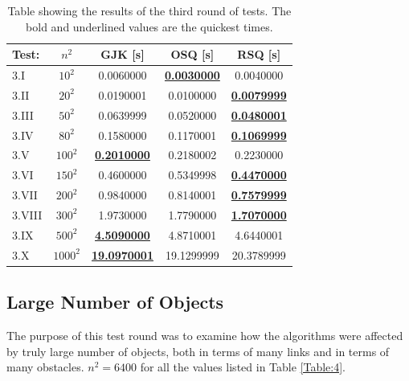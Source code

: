 \begin{table}[h]
	\centering
	\caption{Table showing the results of the third round of tests. The bold and underlined values are the quickest times.}
	\begin{tabular}{|l|c|c|c|c|}
		\hline
		Test: 	& $n^2$ &   \gls{GJK} [s] & O\gls{SQ} [s] & R\gls{SQ} [s]\\
		\hline
		3.I 	&	$10^2$		&	0.0060000	&	\underline{\textbf{0.0030000}}	&	0.0040000	\\
		3.II 	&	$20^2$		&	0.0190001	&	0.0100000	&	\underline{\textbf{0.0079999}}	\\
		3.III 	&	$50^2$		&	0.0639999	&	0.0520000	&	\underline{\textbf{0.0480001}}	\\
		3.IV 	&	$80^2$		&	0.1580000	&	0.1170001	&	\underline{\textbf{0.1069999}}	\\
		3.V 	&	$100^2$		&	\underline{\textbf{0.2010000}}	&	0.2180002	&	0.2230000	\\
		3.VI 	&	$150^2$		&	0.4600000	&	0.5349998	&	\underline{\textbf{0.4470000}}	\\
		3.VII 	&	$200^2$		&	0.9840000	&	0.8140001	&	\underline{\textbf{0.7579999}}	\\
		3.VIII 	&	$300^2$		&	1.9730000	&	1.7790000	&	\underline{\textbf{1.7070000}}	\\
		3.IX	&	$500^2$		&	\underline{\textbf{4.5090000}}	&	4.8710001	&	4.6440001	\\
		3.X		&	$1000^2$	&	\underline{\textbf{19.0970001}}	&	19.1299999	&	20.3789999	\\
		\hline         
	\end{tabular}
	\label{Table:3}
\end{table}

\subsection{Large Number of Objects} \label{subsec:Test4}
The purpose of this test round was to examine how the algorithms were affected by truly large number of objects, both in terms of many links and in terms of many obstacles. $n^2 = 6400$ for all the values listed in Table \ref{Table:4}.

